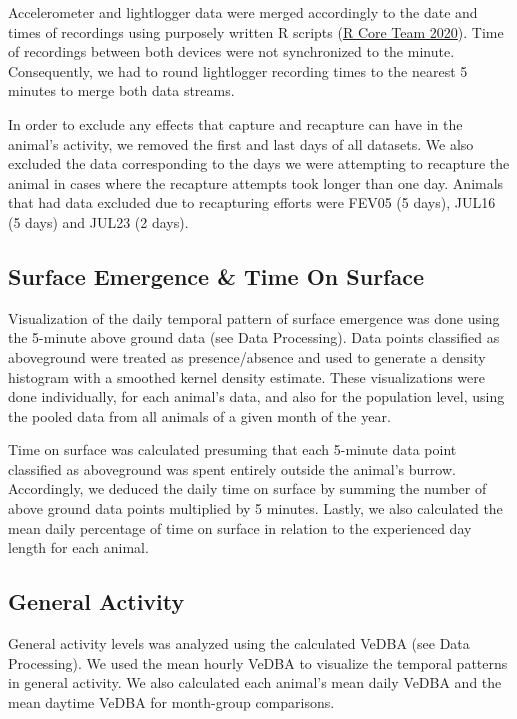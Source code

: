 \documentclass[english,msc,numbers,hidelinks]{coppe}
\begin{document}
  Accelerometer and lightlogger data were merged accordingly to the date and times of recordings using purposely written R scripts (\protect\hyperlink{ref-rcoreteam2020}{R Core Team 2020}). Time of recordings between both devices were not synchronized to the minute. Consequently, we had to round lightlogger recording times to the nearest 5 minutes to merge both data streams.

  In order to exclude any effects that capture and recapture can have in the animal's activity, we removed the first and last days of all datasets. We also excluded the data corresponding to the days we were attempting to recapture the animal in cases where the recapture attempts took longer than one day. Animals that had data excluded due to recapturing efforts were FEV05 (5 days), JUL16 (5 days) and JUL23 (2 days).

  \hypertarget{surface-emergence-time-on-surface}{%
  \subsection{Surface Emergence \& Time On Surface}\label{surface-emergence-time-on-surface}}

  Visualization of the daily temporal pattern of surface emergence was done using the 5-minute above ground data (see Data Processing). Data points classified as aboveground were treated as presence/absence and used to generate a density histogram with a smoothed kernel density estimate. These visualizations were done individually, for each animal's data, and also for the population level, using the pooled data from all animals of a given month of the year.

  Time on surface was calculated presuming that each 5-minute data point classified as aboveground was spent entirely outside the animal's burrow. Accordingly, we deduced the daily time on surface by summing the number of above ground data points multiplied by 5 minutes. Lastly, we also calculated the mean daily percentage of time on surface in relation to the experienced day length for each animal.

  \hypertarget{general-activity}{%
  \subsection{General Activity}\label{general-activity}}

  General activity levels was analyzed using the calculated VeDBA (see Data Processing). We used the mean hourly VeDBA to visualize the temporal patterns in general activity. We also calculated each animal's mean daily VeDBA and the mean daytime VeDBA for month-group comparisons.
\end{document}
